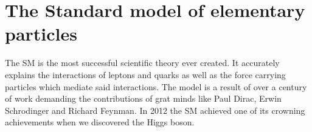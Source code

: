 \chapter{The Standard model of elementary particles}

The \ac{SM} is the most successful scientific theory ever
created. It accurately explains the interactions of leptons and quarks as well as the force
carrying particles which mediate said interactions. The model is a result of over a century of work
demanding the contributions of grat minds like Paul Dirac, Erwin Schrodinger and Richard Feynman.
In 2012 the SM achieved one of its crowning achievements when we discovered the Higgs boson. 